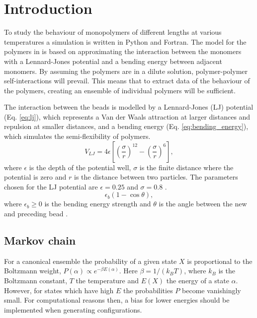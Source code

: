 \section{Introduction}
To study the behaviour of monopolymers of different lengths at various temperatures a simulation is written in Python and Fortran. The model for the polymers in is based on approximating the interaction between the monomers with a Lennard-Jones potential and a bending energy between adjacent monomers. By assuming the polymers are in a dilute solution, polymer-polymer self-interactions will prevail. This means that to extract data of the behaviour of the polymers, creating an ensemble of individual polymers will be sufficient.

The interaction between the beads is modelled by a Lennard-Jones (LJ) potential (Eq. \ref{eq:lj}), which represents a Van der Waals attraction at larger distances and repulsion at smaller distances, and a bending energy (Eq. \ref{eq:bending_energy}), which simulates the semi-flexibility of polymers.
\begin{equation}\label{eq:lj}
    V_{LJ} = 4\epsilon \left[ \left(\frac{\sigma}{r}\right)^{12} - \left(\frac{\sigma}{r}\right)^{6} \right],
\end{equation} where $\epsilon$ is the depth of the potential well, $\sigma$ is the finite distance where the potential is zero and $r$ is the distance between two particles. The parameters chosen for the LJ potential are $\epsilon=0.25$ and $\sigma=0.8$ \cite{jmt}.
\begin{equation}\label{eq:bending_energy}
    \epsilon_b(1-\cos{\theta}),
\end{equation} where $\epsilon_b\geq 0$ is the bending energy strength and $\theta$ is the angle between the new and preceding bead \cite{hsu2011review}.

\subsection{Markov chain}
For a canonical ensemble the probability of a given state $X$ is proportional to the Boltzmann weight, $P(\alpha) \propto e^{-\beta E(\alpha)}$. Here $\beta=1/\left(k_B T\right)$, where $k_B$ is the Boltzmann constant, $T$ the temperature and $E(X)$ the energy of a state $\alpha$. However, for states which have high $E$ the probabilities $P$ become vanishingly small. For computational reasons then, a bias for lower energies should be implemented when generating configurations.

